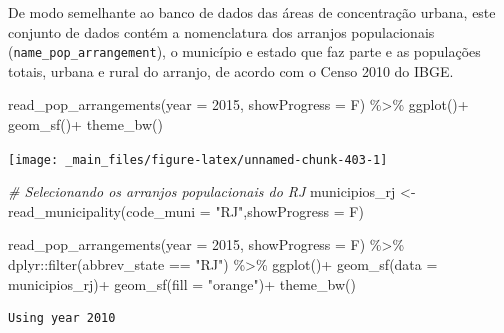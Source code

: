 \documentclass[
  brazilian,
]{book}
\newenvironment{Shaded}{\begin{snugshade}}{\end{snugshade}}
\newcommand{\AttributeTok}[1]{\textcolor[rgb]{0.77,0.63,0.00}{#1}}
\newcommand{\CommentTok}[1]{\textcolor[rgb]{0.56,0.35,0.01}{\textit{#1}}}
\newcommand{\DecValTok}[1]{\textcolor[rgb]{0.00,0.00,0.81}{#1}}
\newcommand{\FunctionTok}[1]{\textcolor[rgb]{0.00,0.00,0.00}{#1}}
\newcommand{\NormalTok}[1]{#1}
\newcommand{\OtherTok}[1]{\textcolor[rgb]{0.56,0.35,0.01}{#1}}
\newcommand{\SpecialCharTok}[1]{\textcolor[rgb]{0.00,0.00,0.00}{#1}}
\newcommand{\StringTok}[1]{\textcolor[rgb]{0.31,0.60,0.02}{#1}}
\begin{document}
De modo semelhante ao banco de dados das áreas de concentração urbana, este conjunto de dados contém a nomenclatura dos arranjos populacionais (\texttt{name\_pop\_arrangement}), o município e estado que faz parte e as populações totais, urbana e rural do arranjo, de acordo com o Censo 2010 do IBGE.

\begin{Shaded}
\begin{Highlighting}[]
\FunctionTok{read\_pop\_arrangements}\NormalTok{(}\AttributeTok{year =} \DecValTok{2015}\NormalTok{,}
                      \AttributeTok{showProgress =}\NormalTok{ F) }\SpecialCharTok{\%\textgreater{}\%}
  \FunctionTok{ggplot}\NormalTok{()}\SpecialCharTok{+}
  \FunctionTok{geom\_sf}\NormalTok{()}\SpecialCharTok{+}
  \FunctionTok{theme\_bw}\NormalTok{()}
\end{Highlighting}
\end{Shaded}

\begin{center}\texttt{[image: \_main\_files/figure-latex/unnamed-chunk-403-1]} \end{center}

\begin{Shaded}
\begin{Highlighting}[]
\CommentTok{\# Selecionando os arranjos populacionais do RJ}
\NormalTok{municipios\_rj }\OtherTok{\textless{}{-}} \FunctionTok{read\_municipality}\NormalTok{(}\AttributeTok{code\_muni =} \StringTok{"RJ"}\NormalTok{,}\AttributeTok{showProgress =}\NormalTok{ F)}

\FunctionTok{read\_pop\_arrangements}\NormalTok{(}\AttributeTok{year =} \DecValTok{2015}\NormalTok{,}
                      \AttributeTok{showProgress =}\NormalTok{ F) }\SpecialCharTok{\%\textgreater{}\%}
\NormalTok{  dplyr}\SpecialCharTok{::}\FunctionTok{filter}\NormalTok{(abbrev\_state }\SpecialCharTok{==} \StringTok{"RJ"}\NormalTok{) }\SpecialCharTok{\%\textgreater{}\%} 
  \FunctionTok{ggplot}\NormalTok{()}\SpecialCharTok{+}
  \FunctionTok{geom\_sf}\NormalTok{(}\AttributeTok{data =}\NormalTok{ municipios\_rj)}\SpecialCharTok{+}
  \FunctionTok{geom\_sf}\NormalTok{(}\AttributeTok{fill =} \StringTok{"orange"}\NormalTok{)}\SpecialCharTok{+}
  \FunctionTok{theme\_bw}\NormalTok{()}
\end{Highlighting}
\end{Shaded}

\begin{verbatim}
Using year 2010
\end{verbatim}
\end{document}
